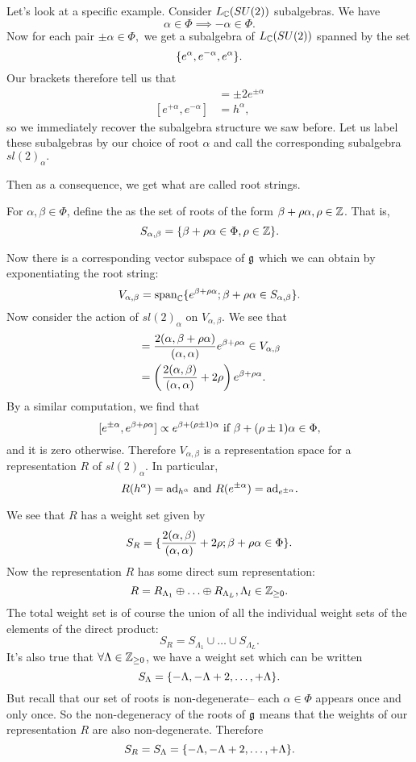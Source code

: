 Let's look at a specific example. Consider $L_{\mathbb{C}} (SU(2))$ subalgebras. We have
$$\alpha\in \Phi \implies -\alpha \in \Phi.$$
Now for each pair $\pm \alpha \in \Phi,$ we get a subalgebra of $L_{\mathbb{C}}(SU(2))$ spanned by the set
$$\{e^\alpha, e^{-\alpha}, e^\alpha\}.$$
Our brackets therefore tell us that
\begin{align*}
    [h^\alpha,e^{\pm\alpha}]&= \pm 2 e^{\pm \alpha}\\
    [e^{+\alpha},e^{-\alpha}]&= h^\alpha,
\end{align*}
so we immediately recover the subalgebra structure we saw before. Let us label these subalgebras by our choice of root $\alpha$ and call the corresponding subalgebra $sl(2)_\alpha.$

Then as a consequence, we get what are called root strings.
\begin{defn}
For $\alpha,\beta\in \Phi$, define the  as the set of roots of the form $\beta+\rho\alpha, \rho\in\mathbb{Z}$. That is,
$$S_{\alpha,\beta}=\{\beta+\rho \alpha \in \Phi, \rho\in \mathbb{Z}\}.$$
\end{defn}
Now there is a corresponding vector subspace of $\mathfrak{g}$ which we can obtain by exponentiating the root string:
$$V_{\alpha,\beta}=\text{span}_{\mathbb{C}}\{e^{\beta+\rho\alpha}; \beta +\rho\alpha \in S_{\alpha,\beta}\}.$$
Now consider the action of $sl(2)_\alpha$ on $V_{\alpha,\beta}.$ We see that
\begin{align*}
    [h^\alpha,e^{\beta+\rho\alpha}] &= \frac{2(\alpha,\beta+\rho \alpha)}{(\alpha,\alpha)}e^{\beta+\rho \alpha} \in V_{\alpha,\beta}\\
    &= \left(\frac{2(\a,\beta)}{(\a,\a)}+2\rho\right)e^{\beta+\rho\a}.
\end{align*}
By a similar computation, we find that
$$[e^{\pm \alpha},e^{\beta+\rho\alpha}]\propto e^{\beta+(\rho\pm 1)\alpha} \text{ if }\beta+(\rho\pm 1)\alpha \in \Phi,$$
and it is zero otherwise.
Therefore $V_{\alpha,\beta}$ is a representation space for a representation $R$ of $sl(2)_\alpha$. In particular,
$$R(h^\alpha)=\text{ad}_{h^\alpha}\text{ and } R(e^{\pm\alpha})=\text{ad}_{e^{\pm \alpha}}.$$

We see that $R$ has a weight set given by
$$S_R=\{\frac{2(\alpha,\beta)}{(\alpha,\alpha)}+2\rho; \beta+\rho\alpha\in \Phi\}.$$
%
Now the representation $R$ has some direct sum representation:
$$R=R_{\Lambda_1}\oplus \ldots \oplus R_{\Lambda_L}, \Lambda_l \in \mathbb{Z}_{\geq 0}.$$
The total weight set is of course the union of all the individual weight sets of the elements of the direct product:
$$S_R=S_{\Lambda_1}\cup \ldots \cup S_{\Lambda_L}.$$
It's also true that $\forall \Lambda \in \mathbb{Z}_{\geq 0}$, we have a weight set which can be written
$$S_\Lambda=\{-\Lambda,-\Lambda+2,\ldots,+\Lambda\}.$$
But recall that our set of roots is non-degenerate-- each $\alpha\in \Phi$ appears once and only once. So the non-degeneracy of the roots of $\mathfrak{g}$ means that the weights of our representation $R$ are also non-degenerate. Therefore
$$S_R=S_\Lambda=\{-\Lambda,-\Lambda+2,\ldots,+\Lambda\}.$$